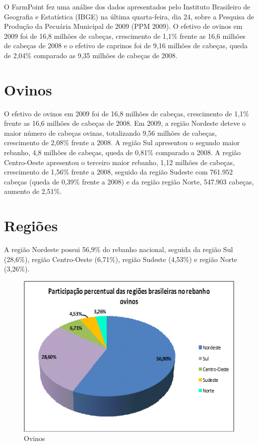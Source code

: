 \documentclass[12pt, a4paper, twocolumn]{article}
\begin{document}
\nocite{Rodrigues:2009:Ovino}
O FarmPoint fez uma análise dos dados apresentados pelo Instituto Brasileiro de Geografia e Estatística (IBGE) na última quarta-feira, dia 24, sobre a Pesquisa de Produção da Pecuária Municipal de 2009 (PPM 2009). O efetivo de ovinos em 2009 foi de 16,8 milhões de cabeças, crescimento de 1,1\% frente as 16,6 milhões de cabeças de 2008 e o efetivo de caprinos foi de 9,16 milhões de cabeças, queda de 2,04\% comparado as 9,35 milhões de cabeças de 2008. 

\section{Ovinos}

O efetivo de ovinos em 2009 foi de 16,8 milhões de cabeças, crescimento de 1,1\% frente as 16,6 milhões de cabeças de 2008. Em 2009, a região Nordeste deteve o maior número de cabeças ovinas, totalizando 9,56 milhões de cabeças, crescimento de 2,08\% frente a 2008. A região Sul apresentou o segundo maior rebanho, 4,8 milhões de cabeças, queda de 0,81\% comparado a 2008. A região Centro-Oeste apresentou o terceiro maior rebanho, 1,12 milhões de cabeças, crescimento de 1,56\% frente a 2008, seguido da região Sudeste com 761.952 cabeças (queda de 0,39\% frente a 2008) e da região região Norte, 547.903 cabeças, aumento de 2,51\%.

\section{Regiões}
A região Nordeste possui 56,9\% do rebanho nacional, seguida da região Sul (28,6\%), região Centro-Oeste (6,71\%), região Sudeste (4,53\%) e região Norte (3,26\%).

\begin{figure}[htb]
\centering
\includegraphics[width=.3\textwidth]{ovinos.png}
\caption{Ovinos}
\label{fig:ovinos}
\end{figure}
\end{document}
